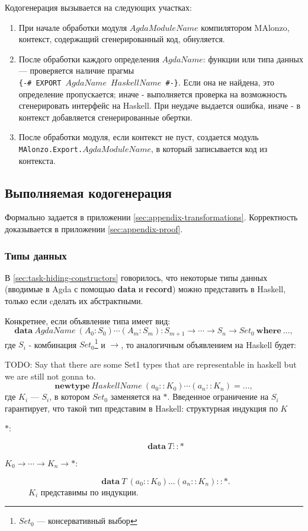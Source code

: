 Кодогенерация вызывается на следующих участках:
\begin{enumerate}
\item При начале обработки модуля \(AgdaModuleName\) компилятором MAlonzo,
      контекст, содержащий сгенерированный код, обнуляется.
\item После обработки каждого определения \(AgdaName\): функции или типа данных ---
      проверяется наличие прагмы \\\texttt{\{-\# EXPORT \(AgdaName\) \(HaskellName\) \#-\}}.
      Если она не найдена, это определение пропускается; иначе - выполняется проверка
      на возможность сгенерировать интерфейс на Haskell. При неудаче выдается ошибка,
      иначе - в контекст добавляется сгенерированные обертки.
\item После обработки модуля, если контекст не пуст, создается модуль\\
      \texttt{MAlonzo.Export.\(AgdaModuleName\)}, в который записывается код из контекста.
\end{enumerate}

\subsection{Выполняемая кодогенерация}

Формально задается в приложении \ref{sec:appendix-transformations}.
Корректность доказывается в приложении \ref{sec:appendix-proof}.

\subsubsection{Типы данных}\label{sec:implementation-datatypes}

В \ref{sec:task-hiding-constructors} говорилось, что некоторые типы данных
(вводимые в Agda с помощью \textbf{data} и \textbf{record}) можно
представить в Haskell, только если cделать их абстрактными.

Конкретнее, если объявление типа имеет вид:
\[
\mathbf{data}\ AgdaName\ (A_0 : S_0) \cdots (A_m : S_m) :
S_{m+1} \rightarrow \cdots \rightarrow S_n \rightarrow Set_0\ \mathbf{where}\ \dots,
\]
где \(S_i\) - комбинация \(Set_0\)\footnote{\(Set_0\) --- консервативный выбор}
и \(\rightarrow\), то аналогичным объявлением на Haskell будет:

TODO: Say that there are some Set1 types that are representable in haskell
but we are still not gonna to.
\[
\mathbf{newtype}\ HaskellName\ (a_0 :: K_0) \cdots (a_n :: K_n) = \dots,
\]
где \(K_i\) --- \(S_i\), в котором \(Set_0\) заменяется на \(*\).
Введенное ограничение на \(S_i\) гарантирует, что такой тип представим
в Haskell: структурная индукция по \(K\)
\begin{description}
\item[\(*\): ]
\[
\mathbf{data}\ T :: *
\]
\item[\(K_0 \rightarrow \cdots \rightarrow K_n \rightarrow *\): ]
\[
\mathbf{data}\ T\ (a_0 :: K_0) \ldots (a_n :: K_n) :: *.
\]
\(K_i\) представимы по индукции.
\end{description}


